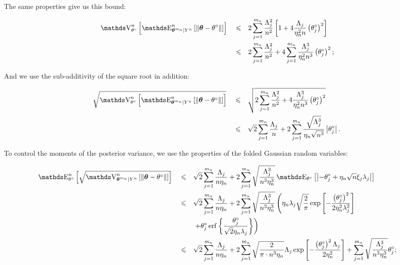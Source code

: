 \begin{pro}
The same properties give us this bound:

\begin{alignat*}{3}
&\V_{\theta^{\circ}}^{n}\left[\E_{\boldsymbol{\theta}^{m_{n}} \vert Y^{n}}^{n}\left[\Vert \boldsymbol{\theta} - \theta^{\circ} \Vert\right]\right] && \leq && 2 \sum\limits_{j = 1}^{m_{n}} \frac{\Lambda_{j}^{2}}{n^{2}} \left[1 + 4 \frac{\Lambda_{j}}{\eta_{n}^{2} n} \left(\theta^{\circ}_{j}\right)^{2}\right]\\
& &&\leq&& 2 \sum\limits_{j = 1}^{m_{n}} \frac{\Lambda_{j}^{2}}{n^{2}} + 4 \sum\limits_{j = 1}^{m_{n}}\frac{\Lambda_{j}^{3}}{\eta_{n}^{2} n^{3}} \left(\theta^{\circ}_{j}\right)^{2};
\end{alignat*}

And we use the sub-additivity of the square root in addition:

\begin{alignat*}{3}
&\sqrt{\V_{\theta^{\circ}}^{n}\left[\E_{\boldsymbol{\theta}^{m_{n}} \vert Y^{n}}^{n}\left[\Vert \boldsymbol{\theta} - \theta^{\circ} \Vert\right]\right]} &&\leq&& \sqrt{2\sum\limits_{j = 1}^{m_{n}} \frac{\Lambda_{j}^{2}}{n^{2}} + 4 \frac{\Lambda_{j}^{3}}{\eta_{n}^{2} n^{3}} \left(\theta^{\circ}_{j}\right)^{2}}\\
& && \leq && \sqrt{2}\sum\limits_{j = 1}^{m_{n}} \frac{\Lambda_{j}}{n} + 2 \sum\limits_{j = 1}^{m_{n}}\frac{\sqrt{\Lambda_{j}^{3}}}{\eta_{n} \sqrt{n^{3}}} \left\vert\theta^{\circ}_{j}\right\vert.\\
\end{alignat*}

To control the moments of the posterior variance, we use the properties of the folded Gaussian random variables:

\begin{alignat*}{3}
&\E_{\theta^{\circ}}^{n}\left[\sqrt{\V_{\boldsymbol{\theta}^{m_{n}} \vert Y^{n}}^{n}\left[\Vert \boldsymbol{\theta} - \theta^{\circ} \Vert\right]}\right] && \leq && \sqrt{2} \sum\limits_{j = 1}^{m_{n}} \frac{\Lambda_{j}}{n \eta_{n}} + 2 \sum\limits_{j = 1}^{m_{n}} \sqrt{\frac{\Lambda_{j}^{3}}{n^{3} \eta_{n}^{3}}} \E_{\theta^{\circ}}\left[\left\vert- \theta^{\circ}_{j} + \eta_{n} \sqrt{n} \xi_{j} \lambda_{j}\right\vert\right]\\
& && \leq && \sqrt{2} \sum\limits_{j = 1}^{m_{n}} \frac{\Lambda_{j}}{n \eta_{n}} + 2 \sum\limits_{j = 1}^{m_{n}} \sqrt{\frac{\Lambda_{j}^{3}}{n^{3} \eta_{n}^{3}}} \left(\eta_{n} \lambda_{j} \sqrt{\frac{2}{\pi}} \exp\left[-\frac{\left(\theta_{j}^{\circ}\right)^{2}}{2 \eta_{n}^{2} \lambda_{j}^{2}}\right]\right.\\
& && && \left.+ \theta_{j}^{\circ} \erf\left\{\frac{\theta_{j}^{\circ}}{\sqrt{2} \eta_{n} \lambda_{j}}\right\}\right)\\
& && \leq && \sqrt{2} \sum\limits_{j = 1}^{m_{n}} \frac{\Lambda_{j}}{n \eta_{n}} + 2 \sum\limits_{j = 1}^{m_{n}} \sqrt{\frac{2}{\pi \cdot n^{3} \eta_{n}}}\Lambda_{j} \exp\left[-\frac{\left(\theta_{j}^{\circ}\right)^{2} \Lambda_{j}}{2 \eta_{n}^{2}}\right] + \sum\limits_{j = 1}^{m_{n}}\sqrt{\frac{\Lambda_{j}^{3}}{n^{3} \eta_{n}^{3}}}\theta_{j}^{\circ};
\end{alignat*}


\end{pro}
